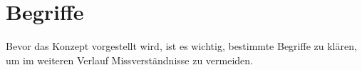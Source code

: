 

\section{Begriffe}

Bevor das Konzept vorgestellt wird, ist es wichtig, bestimmte Begriffe zu
klären, um im weiteren Verlauf Missverständnisse zu vermeiden.

